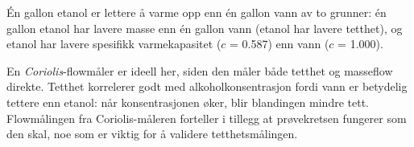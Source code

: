 \vskip 10pt

Én gallon etanol er lettere å varme opp enn én gallon vann av to grunner: én gallon etanol har lavere masse enn én gallon vann (etanol har lavere tetthet), og etanol har lavere spesifikk varmekapasitet ($c$ = 0.587) enn vann ($c$ = 1.000).

\vskip 10pt

En {\it Coriolis}-flowmåler er ideell her, siden den måler både tetthet og masseflow direkte. Tetthet korrelerer godt med alkoholkonsentrasjon fordi vann er betydelig tettere enn etanol: når konsentrasjonen øker, blir blandingen mindre tett. Flowmålingen fra Coriolis-måleren forteller i tillegg at prøvekretsen fungerer som den skal, noe som er viktig for å validere tetthetsmålingen.


